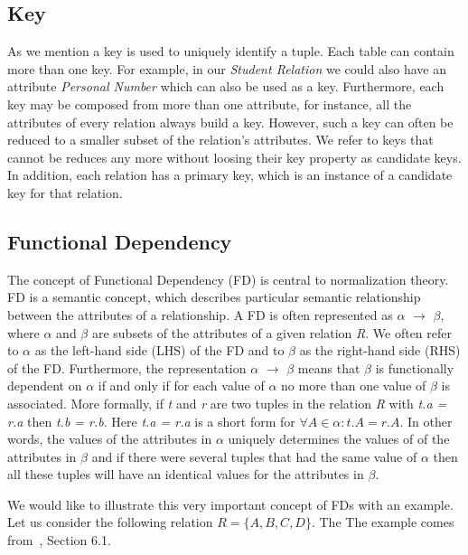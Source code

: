 \subsection{Key}
As we mention a key is used to uniquely  identify a tuple. Each table can contain
more than one key. For example,
in our \textit{Student Relation} we could also have an attribute \textit{Personal Number} 
which can also be used
as a key. Furthermore, each key may be composed from more than one attribute, for instance, 
all the attributes of every relation always build a key. However, such a key can often be reduced
to a smaller subset of the relation's attributes. 
We refer to keys that cannot be reduces any more without loosing their key property as candidate keys.
In addition, each relation has a primary key, which is an instance of a candidate key for that relation.

\subsection{Functional Dependency}
The concept of Functional Dependency (FD) is central to normalization theory. 
FD is a semantic concept, which describes particular semantic relationship 
between the attributes of a relationship. A FD is often represented as $\alpha$ $\rightarrow$ $\beta$, 
where $\alpha$ and $\beta$ are subsets of the attributes of a given relation \textit{R}.
We often refer to $\alpha$ as the left-hand side (LHS) of the FD and to $\beta$ as the 
right-hand side (RHS) of the FD.
Furthermore, the representation $\alpha$ $\rightarrow$ $\beta$ means that $\beta$ is 
functionally dependent on $\alpha$ if and only if 
for each value of $\alpha$ no more than one value of $\beta$ is associated. 
More formally, if \textit{t} and \textit{r} are two tuples in the relation \textit{R}
with \textit{t.a = r.a} then \textit{t.b = r.b}. Here
\textit{t.a = r.a} is a short form for 
\begin{math} \forall A \in \alpha : t.A= r.A \end{math}.  
In other words, the values of the attributes  in $\alpha$ uniquely 
determines the values of of the attributes in $\beta$ and 
if there were several tuples that had the same value of $\alpha$ then all these 
tuples will have an identical values for the attributes in $\beta$. 

We would like to illustrate this very important concept of FDs with an example. 
Let us consider the following relation $R = \{A, B, C, D\}$. 
The The example comes from~\cite{bdb2}, Section 6.1.

